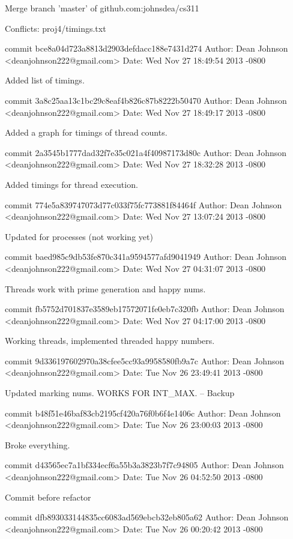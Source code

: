 \documentclass[fleqn,10pt,titlepage]{article}
\begin{document}
    Merge branch 'master' of github.com:johnsdea/cs311

    Conflicts:
        proj4/timings.txt

commit bce8a04d723a8813d2903defdacc188e7431d274
Author: Dean Johnson <deanjohnson222@gmail.com>
Date:   Wed Nov 27 18:49:54 2013 -0800

    Added list of timings.

commit 3a8c25aa13c1bc29c8eaf4b826c87b8222b50470
Author: Dean Johnson <deanjohnson222@gmail.com>
Date:   Wed Nov 27 18:49:17 2013 -0800

    Added a graph for timings of thread counts.

commit 2a3545b1777dad32f7e35c021a4f40987173d80c
Author: Dean Johnson <deanjohnson222@gmail.com>
Date:   Wed Nov 27 18:32:28 2013 -0800

    Added timings for thread execution.

commit 774e5a839747073d77c033f75fc773881f84464f
Author: Dean Johnson <deanjohnson222@gmail.com>
Date:   Wed Nov 27 13:07:24 2013 -0800

    Updated for processes (not working yet)

commit baed985c9db53fe870c341a9594577afd9041949
Author: Dean Johnson <deanjohnson222@gmail.com>
Date:   Wed Nov 27 04:31:07 2013 -0800

    Threads work with prime generation and happy nums.

commit fb5752d701837e3589eb17572071fe0eb7c320fb
Author: Dean Johnson <deanjohnson222@gmail.com>
Date:   Wed Nov 27 04:17:00 2013 -0800

    Working threads, implemented threaded happy numbers.

commit 9d336197602970a38cfee5cc93a9958580fb9a7c
Author: Dean Johnson <deanjohnson222@gmail.com>
Date:   Tue Nov 26 23:49:41 2013 -0800

    Updated marking nums. WORKS FOR INT_MAX. -- Backup

commit b48f51e46baf83cb2195cf420a76f0b6f4e1406c
Author: Dean Johnson <deanjohnson222@gmail.com>
Date:   Tue Nov 26 23:00:03 2013 -0800

    Broke everything.

commit d43565ec7a1bf334ecf6a55b3a3823b7f7c94805
Author: Dean Johnson <deanjohnson222@gmail.com>
Date:   Tue Nov 26 04:52:50 2013 -0800

    Commit before refactor

commit dfb893033144835cc6083ad569ebcb32eb805a62
Author: Dean Johnson <deanjohnson222@gmail.com>
Date:   Tue Nov 26 00:20:42 2013 -0800
\end{document}
